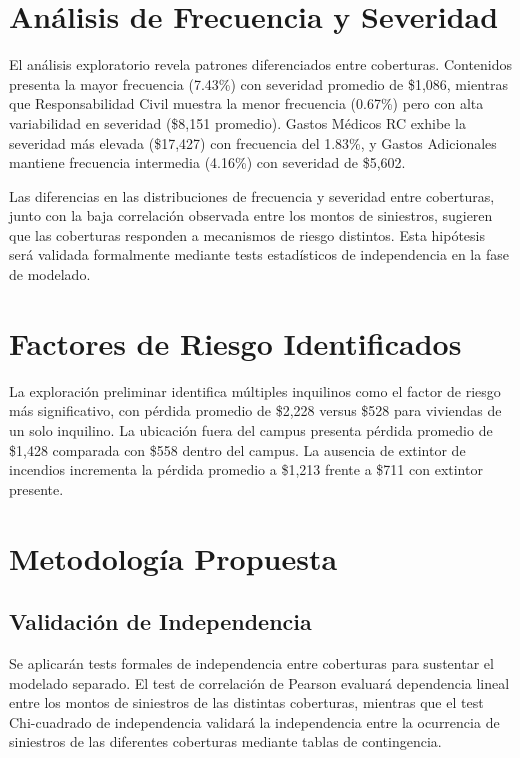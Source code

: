 \documentclass{article}
\begin{document}
\section{Análisis de Frecuencia y Severidad}

El análisis exploratorio revela patrones diferenciados entre coberturas. Contenidos presenta la mayor frecuencia (7.43\%) con severidad promedio de \$1,086, mientras que Responsabilidad Civil muestra la menor frecuencia (0.67\%) pero con alta variabilidad en severidad (\$8,151 promedio). Gastos Médicos RC exhibe la severidad más elevada (\$17,427) con frecuencia del 1.83\%, y Gastos Adicionales mantiene frecuencia intermedia (4.16\%) con severidad de \$5,602.

\medskip

Las diferencias en las distribuciones de frecuencia y severidad entre coberturas, junto con la baja correlación observada entre los montos de siniestros, sugieren que las coberturas responden a mecanismos de riesgo distintos. Esta hipótesis será validada formalmente mediante tests estadísticos de independencia en la fase de modelado.

\section{Factores de Riesgo Identificados}

La exploración preliminar identifica múltiples inquilinos como el factor de riesgo más significativo, con pérdida promedio de \$2,228 versus \$528 para viviendas de un solo inquilino. La ubicación fuera del campus presenta pérdida promedio de \$1,428 comparada con \$558 dentro del campus. La ausencia de extintor de incendios incrementa la pérdida promedio a \$1,213 frente a \$711 con extintor presente.

\section{Metodología Propuesta}

\subsection{Validación de Independencia}

Se aplicarán tests formales de independencia entre coberturas para sustentar el modelado separado. El test de correlación de Pearson evaluará dependencia lineal entre los montos de siniestros de las distintas coberturas, mientras que el test Chi-cuadrado de independencia validará la independencia entre la ocurrencia de siniestros de las diferentes coberturas mediante tablas de contingencia.
\end{document}
